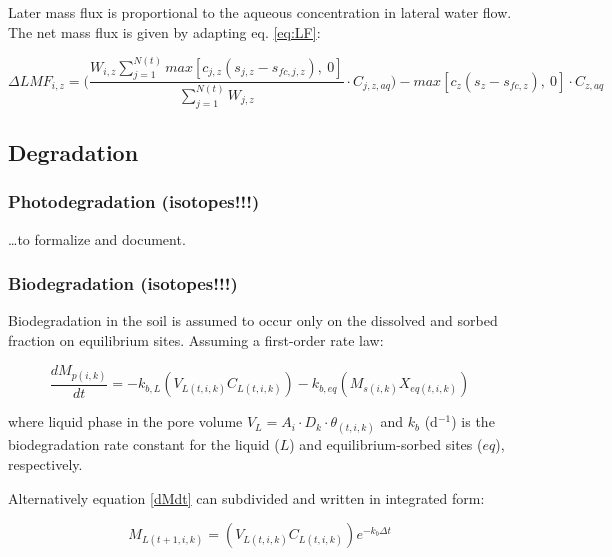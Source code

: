 \documentclass[]{article}
\begin{document}
Later mass flux is proportional to the aqueous concentration in lateral
water flow. The net mass flux is given by adapting eq. \ref{eq:LF}:

\begin{equation}
\Delta LMF_{i,z} = \Big( \frac{W_{i,z} \sum^{N(t)}_{j=1}max[c_{j,z}(s_{j,z}-s_{fc,j,z}),~0]}{ \sum^{N(t)}_{j=1} W_{j,z} } \cdot C_{j,z,aq} \Big) - max[ c_z(s_z-s_{fc,z}),~0]  \cdot C_{z,aq}
\label{eq:LMF}  
\end{equation}

\hypertarget{degradation}{%
\subsection{Degradation}\label{degradation}}

\hypertarget{photodegradation-isotopes}{%
\subsubsection{Photodegradation
(isotopes!!!)}\label{photodegradation-isotopes}}

\ldots{}to formalize and document.

\hypertarget{biodegradation-isotopes}{%
\subsubsection{Biodegradation
(isotopes!!!)}\label{biodegradation-isotopes}}

Biodegradation in the soil is assumed to occur only on the dissolved and
sorbed fraction on equilibrium sites. Assuming a first-order rate law:

\begin{equation} 
\frac{dM_{p(i,k)}}{dt} = -k_{b,L}(V_{L(t,i,k)}C_{L(t,i,k)})-k_{b,eq}(M_{s(i,k)}X_{eq(t,i,k)})
\label{eq:dMdt}
\end{equation}

where liquid phase in the pore volume
\(V_L = A_i \cdot D_k\cdot \theta_{(t,i,k)}\) and \(k_{b}\) (d\(^{-1}\))
is the biodegradation rate constant for the liquid (\(L\)) and
equilibrium-sorbed sites (\(eq\)), respectively.

Alternatively equation \eqref{dMdt} can subdivided and written in
integrated form:

\begin{equation}
M_{L(t+1,i,k)} = (V_{L(t,i,k)}C_{L(t,i,k)})e^{-k_{b} \Delta t} 
\label{eq:ML_t1}
\end{equation}
\end{document}

